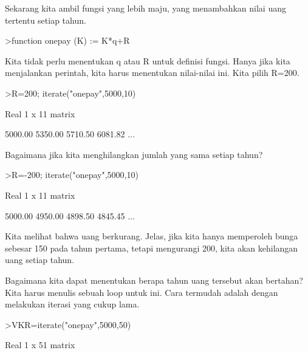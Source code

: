\documentclass[a4paper,10pt]{article}
\begin{document}
\begin{eulernotebook}
\begin{eulercomment}
\begin{eulercomment}
\begin{eulercomment}
\begin{eulercomment}
\begin{eulercomment}
\begin{eulercomment}
\begin{eulercomment}
\begin{eulercomment}
\begin{eulercomment}
\begin{eulercomment}
\begin{eulercomment}
Sekarang kita ambil fungsi yang lebih maju, yang menambahkan nilai
uang tertentu setiap tahun.
\end{eulercomment}
\begin{eulerprompt}
>function onepay (K) := K*q+R
\end{eulerprompt}
\begin{eulercomment}
Kita tidak perlu menentukan q atau R untuk definisi fungsi. Hanya jika
kita menjalankan perintah, kita harus menentukan nilai-nilai ini. Kita
pilih R=200.
\end{eulercomment}
\begin{eulerprompt}
>R=200; iterate("onepay",5000,10)
\end{eulerprompt}
\begin{euleroutput}
  Real 1 x 11 matrix
  
      5000.00     5350.00     5710.50     6081.82     ...
\end{euleroutput}
\begin{eulercomment}
Bagaimana jika kita menghilangkan jumlah yang sama setiap tahun?
\end{eulercomment}
\begin{eulerprompt}
>R=-200; iterate("onepay",5000,10)
\end{eulerprompt}
\begin{euleroutput}
  Real 1 x 11 matrix
  
      5000.00     4950.00     4898.50     4845.45     ...
\end{euleroutput}
\begin{eulercomment}
Kita melihat bahwa uang berkurang. Jelas, jika kita hanya memperoleh
bunga sebesar 150 pada tahun pertama, tetapi mengurangi 200, kita akan
kehilangan uang setiap tahun.

Bagaimana kita dapat menentukan berapa tahun uang tersebut akan
bertahan? Kita harus menulis sebuah loop untuk ini. Cara termudah
adalah dengan melakukan iterasi yang cukup lama.
\end{eulercomment}
\begin{eulerprompt}
>VKR=iterate("onepay",5000,50)
\end{eulerprompt}
\begin{euleroutput}
  Real 1 x 51 matrix
  

\end{euleroutput}
\end{eulercomment}
\end{eulercomment}
\end{eulercomment}
\end{eulercomment}
\end{eulercomment}
\end{eulercomment}
\end{eulercomment}
\end{eulercomment}
\end{eulercomment}
\end{eulercomment}
\end{eulernotebook}
\end{document}
